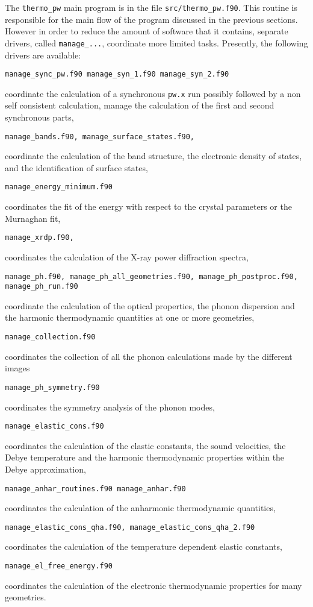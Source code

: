 \documentclass[12pt,a4paper,twoside]{report}
\begin{document}
The \texttt{thermo\_pw} main program is in the file \texttt{src/thermo\_pw.f90}.
This routine is responsible for the main flow of the program discussed
in the previous sections. However in order to reduce the amount of
software that it contains, separate drivers, called 
\texttt{manage\_...},  coordinate more limited tasks.
Presently, the following drivers are available:
\begin{verbatim}
manage_sync_pw.f90 manage_syn_1.f90 manage_syn_2.f90
\end{verbatim}
coordinate the calculation of a synchronous \texttt{pw.x} run possibly 
followed by a non self consistent calculation, manage the calculation of 
the first and second synchronous parts,
\begin{verbatim}
manage_bands.f90, manage_surface_states.f90,      
\end{verbatim}
coordinate the calculation of the band structure, the electronic density
of states, and the identification of surface states,
\begin{verbatim}
manage_energy_minimum.f90      
\end{verbatim}
coordinates the fit of the energy with respect to the crystal parameters
or the Murnaghan fit,
\begin{verbatim}
manage_xrdp.f90,                
\end{verbatim}
coordinates the calculation of the X-ray power diffraction spectra,
\begin{verbatim}
manage_ph.f90, manage_ph_all_geometries.f90, manage_ph_postproc.f90,
manage_ph_run.f90      
\end{verbatim}
coordinate the calculation of the optical properties, the phonon dispersion
and the harmonic thermodynamic quantities at one or more geometries,
\begin{verbatim}
manage_collection.f90
\end{verbatim}
coordinates the collection of all the phonon calculations made by the 
different images
\begin{verbatim}
manage_ph_symmetry.f90
\end{verbatim}
coordinates the symmetry analysis of the phonon modes,
\begin{verbatim}
manage_elastic_cons.f90        
\end{verbatim}
coordinates the calculation of the elastic constants, the sound velocities,
the Debye temperature and the harmonic thermodynamic properties within the 
Debye approximation,
\begin{verbatim}
manage_anhar_routines.f90 manage_anhar.f90               
\end{verbatim}
coordinates the calculation of the anharmonic thermodynamic quantities,
\begin{verbatim}
manage_elastic_cons_qha.f90, manage_elastic_cons_qha_2.f90        
\end{verbatim}
coordinates the calculation of the temperature dependent elastic constants,
\begin{verbatim}
manage_el_free_energy.f90      
\end{verbatim}
coordinates the calculation of the electronic thermodynamic properties for
many geometries.
\end{document}
